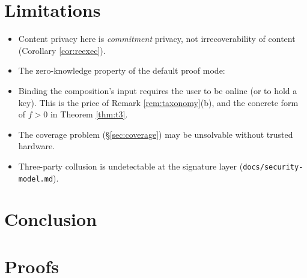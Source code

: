 \documentclass[journal]{IEEEtran}
\newcommand{\need}[1]{}
\newcommand{\fixme}[1]{}
\newcommand{\need}[1]{\textcolor{blue}{[[ NEED: #1 ]]}}
\newcommand{\fixme}[1]{\textcolor{orange}{[[ FIX: #1 ]]}}
\begin{document}
\need{签名 Merkle 日志对照臂（brivora/VAOL 风格）。
结论：ZK 只在 \{私有响应, 私有策略\} 两个角上有正收益。
把"透明模式 ZK 冗余"从批评变成有刻度的设计结论。}

\section{Limitations}
\label{sec:limitations}

\need{必须写进去的：下列五条。每条都要在正文里展开，不是罗列。}
\begin{itemize}
  \item Content privacy here is \emph{commitment} privacy, not
        irrecoverability of content (Corollary \ref{cor:reexec}).
  \item The zero-knowledge property of the default proof mode:
        \fixme{SP1's published security model states explicitly that
        individual STARK proofs do not currently satisfy the
        zero-knowledge property. If groth16 does not become the delivery
        mode, the word ``zero-knowledge'' must leave the title.}
  \item Binding the composition's input requires the user to be online (or to
        hold a key). This is the price of Remark \ref{rem:taxonomy}(b), and
        the concrete form of $f > 0$ in Theorem \ref{thm:t3}.
  \item The coverage problem (\S\ref{sec:coverage}) may be unsolvable without
        trusted hardware.
  \item Three-party collusion is undetectable at the signature layer
        (\texttt{docs/security-model.md}).
\end{itemize}

\section{Conclusion}

\appendix
\section{Proofs}
\need{\textbf{状态（2026-10-12 自检后）}：
Theorem \ref{thm:t1}(H) 与 Theorem \ref{thm:t3} 的证明\textbf{已写在正文}，
此处不再重复。三分法已降级为分类 Remark \ref{rem:taxonomy}，无需证明。
Theorem \ref{thm:t1}(L) 无闭式，只给测量口径（\S\ref{sec:eval}）。
原 T2「分离定理」已\textbf{停用}（见 Remark \ref{rem:designated}）——
本节因此只剩一条待补事项，见下。}
\end{document}
